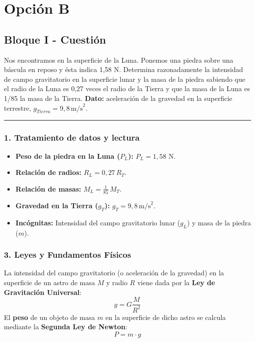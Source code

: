 \newpage
\section{Opción B}
\label{sec:B_2014_jun_ord}

\subsection{Bloque I - Cuestión}
\label{subsec:B1_2014_jun_ord}

\begin{cajaenunciado}
Nos encontramos en la superficie de la Luna. Ponemos una piedra sobre una báscula en reposo y ésta indica 1,58 N. Determina razonadamente la intensidad de campo gravitatorio en la superficie lunar y la masa de la piedra sabiendo que el radio de la Luna es 0,27 veces el radio de la Tierra y que la masa de la Luna es 1/85 la masa de la Tierra.
\textbf{Dato:} aceleración de la gravedad en la superficie terrestre, $g_{Tierra} = 9,8 \, \text{m/s}^2$.
\end{cajaenunciado}
\hrule

\subsubsection*{1. Tratamiento de datos y lectura}
\begin{itemize}
    \item \textbf{Peso de la piedra en la Luna ($P_L$):} $P_L = 1,58$ N.
    \item \textbf{Relación de radios:} $R_L = 0,27 \, R_T$.
    \item \textbf{Relación de masas:} $M_L = \frac{1}{85} \, M_T$.
    \item \textbf{Gravedad en la Tierra ($g_T$):} $g_T = 9,8 \, \text{m/s}^2$.
    \item \textbf{Incógnitas:} Intensidad del campo gravitatorio lunar ($g_L$) y masa de la piedra ($m$).
\end{itemize}

\subsubsection*{3. Leyes y Fundamentos Físicos}
La intensidad del campo gravitatorio (o aceleración de la gravedad) en la superficie de un astro de masa $M$ y radio $R$ viene dada por la \textbf{Ley de Gravitación Universal}:
$$g = G \frac{M}{R^2}$$
El \textbf{peso} de un objeto de masa $m$ en la superficie de dicho astro se calcula mediante la \textbf{Segunda Ley de Newton}:
$$P = m \cdot g$$

